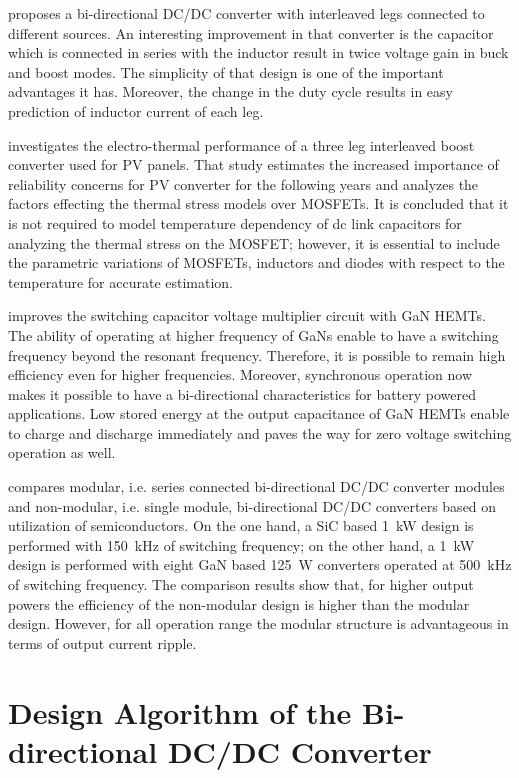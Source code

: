 \documentclass[energies,article,submit,moreauthors,pdftex]{Definitions/mdpi}
\begin{document}
\cite{Zhu2020} proposes a bi-directional DC/DC converter with interleaved legs connected to different sources. An interesting improvement in that converter is the capacitor which is connected in series with the inductor result in twice voltage gain in buck and boost modes. The simplicity of that design is one of the important advantages it has. Moreover, the change in the duty cycle results in easy prediction of inductor current of each leg.

\cite{VanDeSande2020} investigates the electro-thermal performance of a three leg interleaved boost converter used for PV panels. That study estimates the increased importance of reliability concerns for PV converter for the following years and analyzes the factors effecting the thermal stress models over MOSFETs. It is concluded that it is not required to model temperature dependency of dc link capacitors for analyzing the thermal stress on the MOSFET; however, it is essential to include the parametric variations of MOSFETs, inductors and diodes with respect to the temperature for accurate estimation.

\cite{Waradzyn2020} improves the switching capacitor voltage multiplier circuit with GaN HEMTs. The ability of operating at higher frequency of GaNs enable to have a switching frequency beyond the resonant frequency. Therefore, it is possible to remain high efficiency even for higher frequencies. Moreover, synchronous operation now makes it possible to have a bi-directional characteristics for battery powered applications. Low stored energy at the output capacitance of GaN HEMTs enable to charge and discharge immediately and paves the way for zero voltage switching operation as well.

\cite{Frivaldsky2020} compares modular, i.e. series connected bi-directional DC/DC converter modules and non-modular, i.e. single module, bi-directional DC/DC converters based on utilization of semiconductors. On the one hand, a SiC based 1~kW design is performed with 150~kHz of switching frequency; on the other hand, a 1~kW design is performed with eight GaN based 125~W converters operated at 500~kHz of switching frequency. The comparison results show that, for higher output powers the efficiency of the non-modular design is higher than the modular design. However, for all operation range the modular structure is advantageous in terms of output current ripple.

\section{Design Algorithm of the Bi-directional DC/DC Converter}
\end{document}
